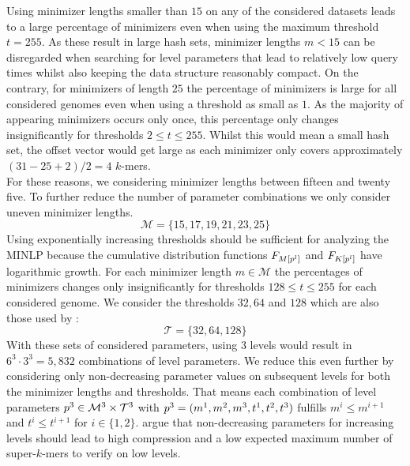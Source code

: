 \documentclass[a4paper,titlepage,onecolumn,oneside,12pt,nenglish,titlepage=firstiscover]{scrbook}
\theoremstyle{plain} %
\theoremstyle{definition} %
\theoremstyle{remark} %
\theoremstyle{plain}
\newcommand{\minimizerLength}{m}
\newcommand{\threshold}{t}
\newcommand{\level}{l}
\newcommand{\possibleMinimizerLengths}{\mathcal{M}}
\newcommand{\possibleThresholds}{\mathcal{T}}
\begin{document}
Using minimizer lengths smaller than $15$ on any of the considered datasets leads to a large percentage of \frequent minimizers even when using the maximum threshold $\threshold=255$. As these result in large hash sets, minimizer lengths $\minimizerLength < 15$ can be disregarded when searching for level parameters that lead to relatively low query times whilst also keeping the data structure reasonably compact.
On the contrary, for minimizers of length $25$ the percentage of \infrequent minimizers is large for all considered genomes even when using a threshold as small as $1$. As the majority of appearing minimizers occurs only once, this percentage only changes insignificantly for thresholds $2 \leq t \leq 255$. Whilst this would mean a small hash set, the offset vector would get large as each minimizer only covers approximately $(31-25+2)/2 = 4$ $k$-mers.\\
For these reasons, we considering minimizer lengths between fifteen and twenty five. To further reduce the number of parameter combinations we only consider uneven minimizer lengths.
\begin{equation}
	\possibleMinimizerLengths = \{15,17,19,21,23,25\}
\end{equation}
Using exponentially increasing thresholds should be sufficient for analyzing the MINLP because the cumulative distribution functions $\CDF{\compactZV{M}{\levelParameters{\level}}}$ and $\CDF{\compactZV{K}{\levelParameters{\level}}}$ have logarithmic growth. For each minimizer length $\minimizerLength \in \possibleMinimizerLengths$ the percentages of \infrequent minimizers changes only insignificantly for thresholds $128 \leq t \leq 255$ for each considered genome.
We consider the thresholds $32,64$ and $128$ which are also those used by \citet{schulte-mattler_rshash_2026}: 
\begin{equation}
	\possibleThresholds = \{32,64,128\}
\end{equation}
With these sets of considered parameters, using $3$ levels would result in $6^3 \cdot 3^3 = 5,832$ combinations of level parameters. We reduce this even further by considering only non-decreasing parameter values on subsequent levels for both the minimizer lengths and thresholds. That means each combination of level parameters $\levelParameters{3} \in \possibleMinimizerLengths^3 \times \possibleThresholds^3$ with $\levelParameters{3} = (\minimizerLength^1, \minimizerLength^2, \minimizerLength^3, \threshold^1, \threshold^2, \threshold^3)$ fulfills $\minimizerLength^i \leq \minimizerLength^{i+1}$ and $\threshold^i \leq \threshold^{i+1}$ for $i \in \{1,2\}$. \citet{schulte-mattler_rshash_2026} argue that non-decreasing parameters for increasing levels should lead to high compression and a low expected maximum number of super-$k$-mers to verify on low levels.\\
\end{document}
